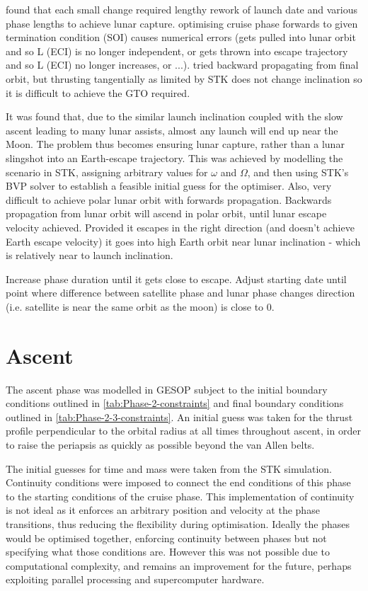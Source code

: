 found that each small change required lengthy rework of launch date and various phase lengths to achieve lunar capture. 
optimising cruise phase forwards to given termination condition (SOI) causes numerical errors (gets pulled into lunar orbit and so L (ECI) is no longer independent, or gets thrown into escape trajectory and so L (ECI) no longer increases, or ...).
tried backward propagating from final orbit, but thrusting tangentially as limited by STK does not change inclination so it is difficult to achieve the GTO required.

It was found that, due to the similar launch inclination coupled with the slow ascent leading to many lunar assists, almost any launch will end up near the Moon. The problem thus becomes ensuring lunar capture, rather than a lunar slingshot into an Earth-escape trajectory. This was achieved by modelling the scenario in STK, assigning arbitrary values for $\omega$ and $\Omega$, and then using STK's BVP solver to establish a feasible initial guess for the optimiser. 
Also, very difficult to achieve polar lunar orbit with forwards propagation. Backwards propagation from lunar orbit will ascend in polar orbit, until lunar escape velocity achieved. Provided it escapes in the right direction (and doesn't achieve Earth escape velocity) it goes into high Earth orbit near lunar inclination - which is relatively near to launch inclination.

Increase phase duration until it gets close to escape.
Adjust starting date until point where difference between satellite phase and lunar phase changes direction (i.e. satellite is near the same orbit as the moon) is close to 0\degrees.


\section{Ascent} \label{sec:Ascent}
The ascent phase was modelled in GESOP subject to the initial boundary conditions outlined in \autoref{tab:Phase-2-constraints} and final boundary conditions outlined in \autoref{tab:Phase-2-3-constraints}. An initial guess was taken for the thrust profile perpendicular to the orbital radius at all times throughout ascent, in order to raise the periapsis as quickly as possible beyond the van Allen belts.

The initial guesses for time and mass were taken from the STK simulation. Continuity conditions were imposed to connect the end conditions of this phase to the starting conditions of the cruise phase. This implementation of continuity is not ideal as it enforces an arbitrary position and velocity at the phase transitions, thus reducing the flexibility during optimisation. Ideally the phases would be optimised together, enforcing continuity between phases but not specifying what those conditions are. However this was not possible due to computational complexity, and remains an improvement for the future, perhaps exploiting parallel processing and supercomputer hardware.

